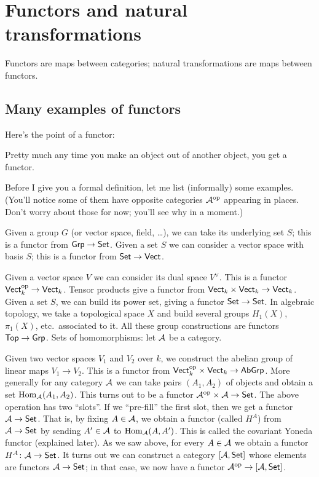 \chapter{Functors and natural transformations}
\label{ch:functors}
Functors are maps between categories; natural transformations are maps between functors.

\section{Many examples of functors}
Here's the point of a functor:
\begin{moral}
	Pretty much any time you make an object out of another object,
	you get a functor.
\end{moral}
Before I give you a formal definition, let me list (informally) some examples.
(You'll notice some of them have opposite categories $\AA\op$ appearing in places.
Don't worry about those for now; you'll see why in a moment.)
\begin{itemize}
	\ii Given a group $G$ (or vector space, field, \dots), we can take its underlying set $S$;
	this is a functor from $\catname{Grp} \to \catname{Set}$.
	\ii Given a set $S$ we can consider a vector space with basis $S$;
	this is a functor from $\catname{Set} \to \catname{Vect}$.

	\ii Given a vector space $V$ we can consider its dual space $V^\vee$.
	This is a functor $\catname{Vect}_k\op \to \catname{Vect}_k$.
	\ii Tensor products give a functor from $\catname{Vect}_k \times \catname{Vect}_k \to \catname{Vect}_k$.
	\ii Given a set $S$, we can build its power set, giving a functor $\catname{Set} \to \catname{Set}$.
	\ii In algebraic topology, we take a topological space $X$ and build several groups $H_1(X)$, $\pi_1(X)$,
	etc.\ associated to it. All these group constructions are functors $\catname{Top} \to \catname{Grp}$.
	\ii Sets of homomorphisms: let $\AA$ be a category.
	\begin{itemize}
		\ii Given two vector spaces $V_1$ and $V_2$ over $k$,
		we construct the abelian group of linear maps $V_1 \to V_2$.
		This is a functor from $\catname{Vect}_k\op \times \catname{Vect}_k \to \catname{AbGrp}$.
		\ii More generally for any category $\AA$
		we can take pairs $(A_1, A_2)$ of objects and
		obtain a set $\Hom_{\AA}(A_1, A_2)$.
		This turns out to be a functor $\AA\op \times \AA \to \catname{Set}$.
		\ii The above operation has two ``slots''.
		If we ``pre-fill'' the first slot, then we get a functor $\AA \to \catname{Set}$.
		That is, by fixing $A \in \AA$, we obtain a functor (called $H^A$)
		from $\AA \to \catname{Set}$ by sending $A' \in \AA$ to $\Hom_{\AA} (A, A')$.
		This is called the covariant Yoneda functor (explained later).
		\ii As we saw above,
		for every $A \in \AA$ we obtain a functor $H^A \colon \AA \to \catname{Set}$.
		It turns out we can construct a category $[\AA, \catname{Set}]$
		whose elements are functors $\AA \to \catname{Set}$;
		in that case, we now have a functor $\AA\op \to [\AA, \catname{Set}]$.
	\end{itemize}
\end{itemize}

